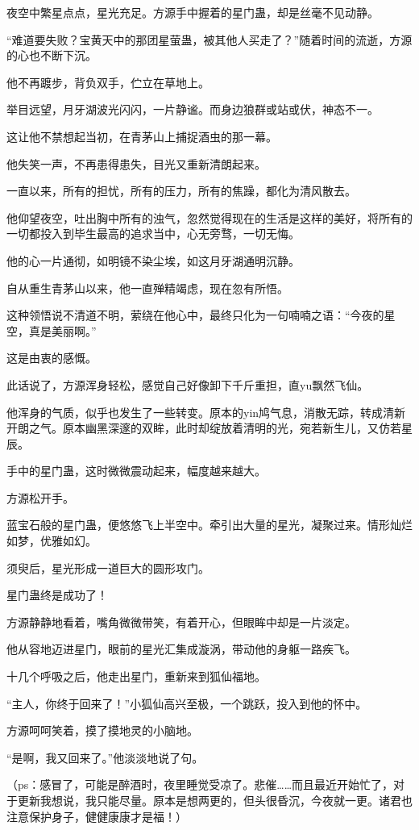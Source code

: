 \begin{this_body}
夜空中繁星点点，星光充足。方源手中握着的星门蛊，却是丝毫不见动静。

“难道要失败？宝黄天中的那团星萤蛊，被其他人买走了？”随着时间的流逝，方源的心也不断下沉。

他不再踱步，背负双手，伫立在草地上。

举目远望，月牙湖波光闪闪，一片静谧。而身边狼群或站或伏，神态不一。

这让他不禁想起当初，在青茅山上捕捉酒虫的那一幕。

他失笑一声，不再患得患失，目光又重新清朗起来。

一直以来，所有的担忧，所有的压力，所有的焦躁，都化为清风散去。

他仰望夜空，吐出胸中所有的浊气，忽然觉得现在的生活是这样的美好，将所有的一切都投入到毕生最高的追求当中，心无旁骛，一切无悔。

他的心一片通彻，如明镜不染尘埃，如这月牙湖通明沉静。

自从重生青茅山以来，他一直殚精竭虑，现在忽有所悟。

这种领悟说不清道不明，萦绕在他心中，最终只化为一句喃喃之语：“今夜的星空，真是美丽啊。”

这是由衷的感慨。

此话说了，方源浑身轻松，感觉自己好像卸下千斤重担，直yu飘然飞仙。

他浑身的气质，似乎也发生了一些转变。原本的yin鸠气息，消散无踪，转成清新开朗之气。原本幽黑深邃的双眸，此时却绽放着清明的光，宛若新生儿，又仿若星辰。

手中的星门蛊，这时微微震动起来，幅度越来越大。

方源松开手。

蓝宝石般的星门蛊，便悠悠飞上半空中。牵引出大量的星光，凝聚过来。情形灿烂如梦，优雅如幻。

须臾后，星光形成一道巨大的圆形攻门。

星门蛊终是成功了！

方源静静地看着，嘴角微微带笑，有着开心，但眼眸中却是一片淡定。

他从容地迈进星门，眼前的星光汇集成漩涡，带动他的身躯一路疾飞。

十几个呼吸之后，他走出星门，重新来到狐仙福地。

“主人，你终于回来了！”小狐仙高兴至极，一个跳跃，投入到他的怀中。

方源呵呵笑着，摸了摸地灵的小脑地。

“是啊，我又回来了。”他淡淡地说了句。

（ps：感冒了，可能是醉酒时，夜里睡觉受凉了。悲催……而且最近开始忙了，对于更新我想说，我只能尽量。原本是想两更的，但头很昏沉，今夜就一更。诸君也注意保护身子，健健康康才是福！）

\end{this_body}

